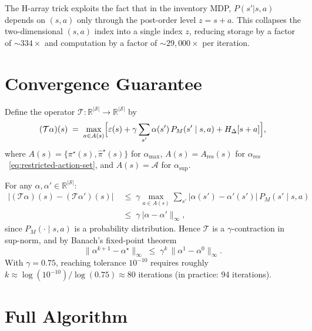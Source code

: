 \documentclass[11pt]{article}
\newcommand{\pistar}{\pi^\star}
\newcommand{\pihatstar}{\hat\pi^\star}
\newcommand{\alphares}{\alpha_{\mathrm{res}}}
\begin{document}
The H-array trick exploits the fact that in the inventory MDP, $P(s'|s,a)$
depends on $(s,a)$ only through the post-order level $z = s + a$.  This
collapses the two-dimensional $(s,a)$ index into a single index $z$, reducing
storage by a factor of $\sim\!334\times$ and computation by a factor of
$\sim\!29{,}000\times$ per iteration.

\section{Convergence Guarantee}

Define the operator $\mathcal{T}\colon \mathbb{R}^{|\mathcal{S}|} \to
\mathbb{R}^{|\mathcal{S}|}$ by
\[
  (\mathcal{T}\alpha)(s)
  \;=\; \max_{a \in A(s)}
        \Bigl[\varepsilon(s) + \gamma \sum_{s'} \alpha(s')\, P_M(s' \mid s, a)
        + H_\Delta[s+a]\Bigr],
\]
where $A(s) = \{\pistar(s), \pihatstar(s)\}$ for $\alpha_{\max}$,
$A(s) = A_{\mathrm{res}}(s)$ for $\alphares$~\eqref{eq:restricted-action-set},
and $A(s) = \mathcal{A}$ for $\alpha_{\sup}$.

For any $\alpha, \alpha' \in \mathbb{R}^{|\mathcal{S}|}$:
\begin{align*}
  \bigl|(\mathcal{T}\alpha)(s) - (\mathcal{T}\alpha')(s)\bigr|
  &\;\le\; \gamma \max_{a \in A(s)} \sum_{s'} \bigl|\alpha(s') - \alpha'(s')\bigr|
           \, P_M(s' \mid s, a) \\
  &\;\le\; \gamma \ |\alpha - \alpha'\|_\infty,
\end{align*}
since $P_M(\cdot \mid s, a)$ is a probability distribution.  Hence $\mathcal{T}$
is a $\gamma$-contraction in sup-norm, and by Banach's fixed-point theorem
\[
  \|\alpha^{k+1} - \alpha^\star\|_\infty
  \;\le\; \gamma^k \, \|\alpha^1 - \alpha^0\|_\infty.
\]
With $\gamma = 0.75$, reaching tolerance $10^{-10}$ requires roughly
$k \approx \log(10^{-10}) / \log(0.75) \approx 80$ iterations (in practice:
94 iterations).

\section{Full Algorithm}
\end{document}
